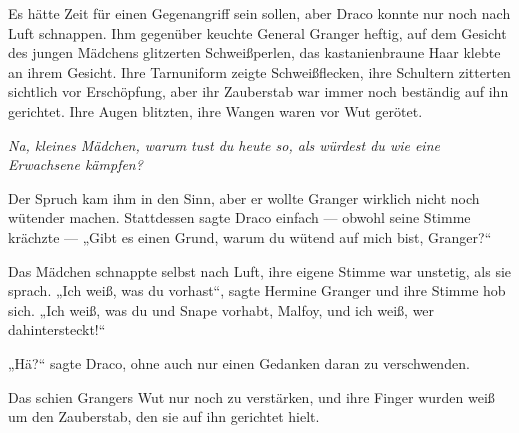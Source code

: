 Es hätte Zeit für einen Gegenangriff sein sollen, aber Draco konnte nur noch nach Luft schnappen. Ihm gegenüber keuchte General Granger heftig, auf dem Gesicht des jungen Mädchens glitzerten Schweißperlen, das kastanienbraune Haar klebte an ihrem Gesicht. Ihre Tarnuniform zeigte Schweißflecken, ihre Schultern zitterten sichtlich vor Erschöpfung, aber ihr Zauberstab war immer noch beständig auf ihn gerichtet. Ihre Augen blitzten, ihre Wangen waren vor Wut gerötet.

\emph{Na, kleines Mädchen, warum tust du heute so, als würdest du wie eine Erwachsene kämpfen?}

Der Spruch kam ihm in den Sinn, aber er wollte Granger wirklich nicht noch wütender machen. Stattdessen sagte Draco einfach — obwohl seine Stimme krächzte —
„Gibt es einen Grund, warum du wütend auf mich bist, Granger?“

Das Mädchen schnappte selbst nach Luft, ihre eigene Stimme war unstetig, als sie sprach.
„Ich weiß, was du vorhast“, sagte Hermine Granger und ihre Stimme hob sich.
„Ich weiß, was du und Snape vorhabt, Malfoy, und ich weiß, wer dahintersteckt!“

„Hä?“ sagte Draco, ohne auch nur einen Gedanken daran zu verschwenden.

Das schien Grangers Wut nur noch zu verstärken, und ihre Finger wurden weiß um den Zauberstab, den sie auf ihn gerichtet hielt.

